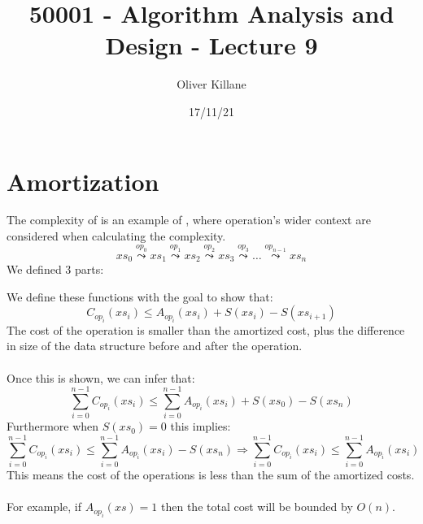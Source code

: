 \documentclass{report}
\title{50001 - Algorithm Analysis and Design - Lecture 9}
\author{Oliver Killane}
\date{17/11/21}
\begin{document}
\maketitle
{}
\section*{Amortization}
The complexity of  is an example of , where operation's wider context are considered when calculating the complexity.
\[xs_0 \overset{op_0}{\leadsto} xs_1 \overset{op_1}{\leadsto} xs_2 \overset{op_2}{\leadsto} xs_3 \overset{op_3}{\leadsto} \dots \overset{op_{n-1}}{\leadsto} xs_n\]
We defined 3 parts:
\begin{enumerate}
\end{enumerate}
We define these functions with the goal to show that:
\[C_{op_i}(xs_i) \leq A_{op_i} (xs_i) + S(xs_i) - S(xs_{i+1})\]
The cost of the operation is smaller than the amortized cost, plus the difference in size of the data structure before and after the operation.
\\
\\ Once this is shown, we can infer that:
\[\sum^{n-1}_{i=0}C_{op_i}(xs_i) \leq \sum^{n-1}_{i=0}A_{op_i}(xs_i) + S(xs_0) - S(xs_n)\]
Furthermore when $S(xs_0) = 0$ this implies:
\[\sum^{n-1}_{i=0}C_{op_i}(xs_i) \leq \sum^{n-1}_{i=0}A_{op_i}(xs_i) - S(xs_n) \Rightarrow \sum^{n-1}_{i=0}C_{op_i}(xs_i) \leq \sum^{n-1}_{i=0}A_{op_i}(xs_i)\]
This means the cost of the operations is less than the sum of the amortized costs.
\\
\\ For example, if $A_{op_i}(xs) = 1$ then the total cost will be bounded by $O(n)$.
\end{document}
